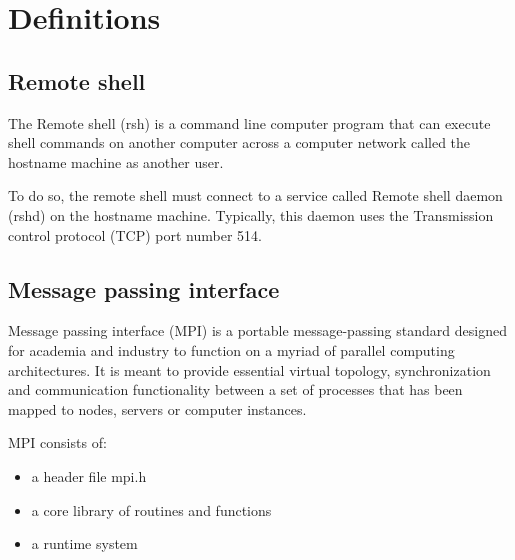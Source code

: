 \section{Definitions}
\subsection{Remote shell}

The Remote shell (rsh) \cite{remoteshhell} is a command line computer program that can execute shell commands on another computer across a computer network called the hostname machine as another user.

To do so, the remote shell must connect to a service called Remote shell daemon (rshd) on the hostname machine. Typically, this daemon uses the Transmission control protocol (TCP) port number 514.

\subsection{Message passing interface}

Message passing interface (MPI) \cite{mpi} is a portable message-passing standard designed for academia and industry to function on a myriad of parallel computing architectures. It is meant to provide essential virtual topology, synchronization and communication functionality between a set of processes that has been mapped to nodes, servers or computer instances.

MPI consists of:
\begin{itemize}
    \item a header file mpi.h
    \item a core library of routines and functions
    \item a runtime system
\end{itemize}

